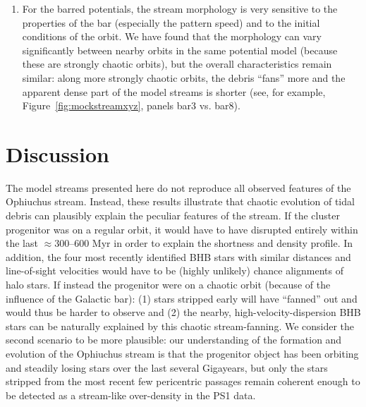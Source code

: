 \documentclass[letterpaper,12pt,preprint]{aastex}
\begin{document}
\begin{enumerate}
	\item For the barred potentials, the stream morphology is very sensitive to the properties of the bar (especially the pattern speed) and to the initial conditions of the orbit. We have found that the morphology can vary significantly between nearby orbits in the same potential model (because these are strongly chaotic orbits), but the overall characteristics remain similar: along more strongly chaotic orbits, the debris ``fans'' more and the apparent dense part of the model streams is shorter (see, for example, Figure~\ref{fig:mockstreamxyz}, panels bar3 vs. bar8).
\end{enumerate}


\section{Discussion}\label{sec:discussion}

The model streams presented here do not reproduce all observed features of the Ophiuchus stream. Instead, these results illustrate that chaotic evolution of tidal debris can plausibly explain the peculiar features of the stream. If the cluster progenitor was on a regular orbit, it would have to have disrupted entirely within the last $\approx$300--600 Myr in order to explain the shortness and density profile. In addition, the four most recently identified BHB stars with similar distances and line-of-sight velocities would have to be (highly unlikely) chance alignments of halo stars. If instead the progenitor were on a chaotic orbit (because of the influence of the Galactic bar): (1) stars stripped early will have ``fanned'' out and would thus be harder to observe and (2) the nearby, high-velocity-dispersion BHB stars can be naturally explained by this chaotic stream-fanning. We consider the second scenario to be more plausible: our understanding of the formation and evolution of the Ophiuchus stream is that the progenitor object has been orbiting and steadily losing stars over the last several Gigayears, but only the stars stripped from the most recent few pericentric passages remain coherent enough to be detected as a stream-like over-density in the PS1 data.
\end{document}
